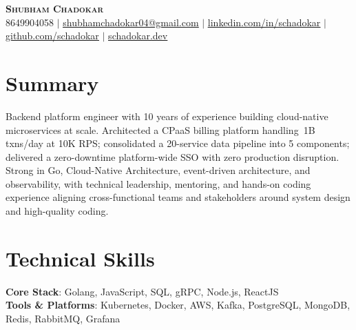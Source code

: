 \documentclass[letterpaper,11pt]{article}
\begin{document}
\begin{center}
    \textbf{\Huge \scshape Shubham Chadokar} \\ \vspace{6pt}
    \small 8649904058 $|$ \href{mailto:shubhamchadokar04@gmail.com}{\underline{shubhamchadokar04@gmail.com}} $|$
    \href{https://linkedin.com/in/schadokar}{\underline{linkedin.com/in/schadokar}} $|$
    \href{https://github.com/schadokar}{\underline{github.com/schadokar}} $|$
    \href{https://schadokar.dev}{\underline{schadokar.dev}}
\end{center}

\vspace{-8pt}
\section{Summary}
\small{Backend platform engineer with 10 years of experience building cloud-native microservices at scale. Architected a CPaaS billing platform handling~1B txns/day at 10K RPS; consolidated a 20-service data pipeline into 5 components; delivered a zero-downtime platform-wide SSO with zero production disruption. Strong in Go, Cloud-Native Architecture, event-driven architecture, and observability, with technical leadership, mentoring, and hands-on coding experience aligning cross-functional teams and stakeholders around system design and high-quality coding.}
\vspace{-4pt}

%
\section{Technical Skills}
 \begin{itemize}[leftmargin=0in, label={}]
    \small{\item{
     \textbf{Core Stack}{: Golang, JavaScript, SQL, gRPC, Node.js, ReactJS} \\
     \textbf{Tools \& Platforms}{: Kubernetes, Docker, AWS, Kafka, PostgreSQL, MongoDB, Redis, RabbitMQ, Grafana}
    }}
 \end{itemize}

\end{document}
